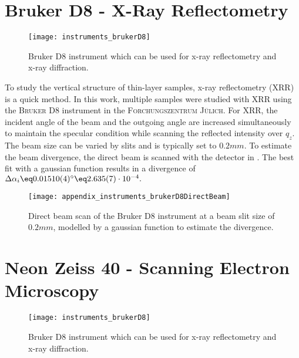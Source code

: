 \documentclass[\main/dresen_thesis.tex]{subfiles}
\begin{document}
\section{Bruker D8 - X-Ray Reflectometry}
\label{app:additionalExperimentalTechniques:xrr}
\begin{figure}[h]
  \centering
  \texttt{[image: instruments\_brukerD8]}
  \caption{\label{fig:appendix:instruments:brukerD8}Bruker D8 instrument which can be used for x-ray reflectometry and x-ray diffraction.}
\end{figure}
To study the vertical structure of thin-layer samples, x-ray reflectometry (XRR) is a quick method. In this work, multiple samples were studied with XRR using the \textsc{Bruker D8} instrument in the \textsc{Forchungszentrum J\"ulich}.
For XRR, the incident angle of the beam and the outgoing angle are increased simultaneously to maintain the specular condition while scanning the reflected intensity over $q_z$.
The beam size can be varied by slits and is typically set to $0.2 \unit{mm}$.
To estimate the beam divergence, the direct beam is scanned with the detector in .
The best fit with a gaussian function results in a divergence of $\Delta \alpha_i \eq 0.01510(4) ^\circ \eq 2.635(7) \cdot 10^{-4}.$
\begin{figure}[h]
  \centering
  \texttt{[image: appendix\_instruments\_brukerD8DirectBeam]}
  \caption{\label{fig:appendix:instruments:brukerD8DirectBeam}Direct beam scan of the Bruker D8 instrument at a beam slit size of $0.2 \unit{mm}$, modelled by a gaussian function to estimate the divergence.}
\end{figure}

\section{Neon Zeiss 40 - Scanning Electron Microscopy}
\label{app:additionalExperimentalTechniques:sem}
\begin{figure}[h]
  \centering
  \texttt{[image: instruments\_brukerD8]}
  \caption{\label{fig:appendix:instruments:brukerD8}Bruker D8 instrument which can be used for x-ray reflectometry and x-ray diffraction.}
\end{figure}
\end{document}
